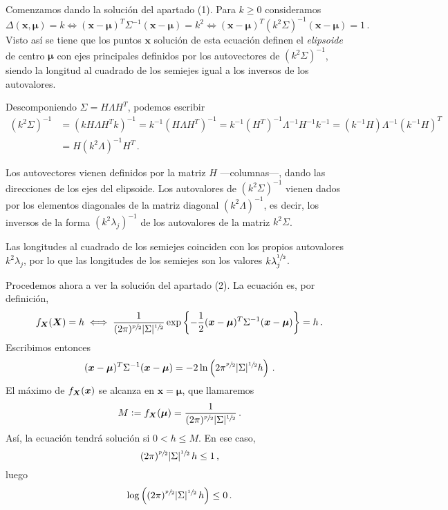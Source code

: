 \begin{sol}
  Comenzamos dando la solución del apartado (1). Para $k \geq 0$ consideramos \[
      \Delta(\boldsymbol x, \boldsymbol \mu) = k \iff (\boldsymbol x - \boldsymbol \mu)^T\Sigma^{-1}(\boldsymbol x - \boldsymbol \mu) = k^2 \iff (\boldsymbol x - \boldsymbol \mu)^T(k^2\Sigma)^{-1}(\boldsymbol x - \boldsymbol \mu) = 1\,.
      \] Visto así se tiene que los puntos $\boldsymbol x$ solución de esta ecuación definen el \textit{elipsoide} de centro $\boldsymbol \mu$ con ejes principales definidos por los autovectores de $(k^2\Sigma)^{-1}$, siendo la longitud al cuadrado de los semiejes igual a los inversos de los autovalores.

      Descomponiendo $\Sigma = H\Lambda H^T$, podemos escribir \begin{align*}
        (k^2\Sigma)^{-1} 
        &= (kH\Lambda H^T k)^{-1} 
        = k^{-1}(H\Lambda H^T)^{-1} 
        = k^{-1}(H^T)^{-1}\Lambda^{-1}H^{-1}k^{-1} 
        = (k^{-1}H)\Lambda^{-1}(k^{-1}H)^T\\
        &= H(k^2\Lambda)^{-1}H^T\,.
      \end{align*}

      Los autovectores vienen definidos por la matriz $H$ —columnas—, dando las direcciones de los ejes del elipsoide. Los autovalores de $(k^2\Sigma)^{-1}$ vienen dados por los elementos diagonales de la matriz diagonal $(k^2\Lambda)^{-1}$, es decir, los inversos de la forma $(k^2\lambda_j)^{-1}$ de los autovalores de la matriz $k^2\Sigma$.

      Las longitudes al cuadrado de los semiejes coinciden con los propios autovalores $k^2\lambda_j$, por lo que las longitudes de los semiejes son los valores $k\lambda_j^{\sfrac{1}{2}}$.

      Procedemos ahora a ver la solución del apartado (2). La ecuación es, por definición, \[
        f_{\boldsymbol{X}}(\boldsymbol X) 
        = h \iff \frac{1}{(2\pi)^{\sfrac{p}{2}} |\Sigma|^{\sfrac{1}{2}}}\exp\left\{-\frac{1}{2}(\boldsymbol x - \boldsymbol \mu)^T\Sigma^{-1}(\boldsymbol x - \boldsymbol \mu)\right\} 
        = h\,.\] 
      Escribimos entonces \[
        (\boldsymbol x - \boldsymbol \mu)^T \Sigma^{-1}(\boldsymbol x - \boldsymbol \mu) 
        = - 2\ln\left(2\pi^{\sfrac{p}{2}}|\Sigma|^{\sfrac{1}{2}}h\right)\,.
          \]
      El máximo de $f_{\boldsymbol{X}}(\boldsymbol x)$ se alcanza en $\boldsymbol x = \boldsymbol \mu$, que llamaremos \[
        M 
        \vcentcolon= f_{\boldsymbol{X}}(\boldsymbol \mu) 
        = \frac{1}{(2\pi)^{\sfrac{p}{2}} |\Sigma|^{\sfrac{1}{2}}}\,.
      \] Así, la ecuación tendrá solución si $0 < h \leq M$. En ese caso, \[(2\pi)^{\sfrac{p}{2}}|\Sigma|^{\sfrac{1}{2}}\,h \leq 1\,,\] luego \[\log\left((2\pi)^{\sfrac{p}{2}}|\Sigma|^{\sfrac{1}{2}}\,h\right) \leq 0\,.\]
\end{sol}

